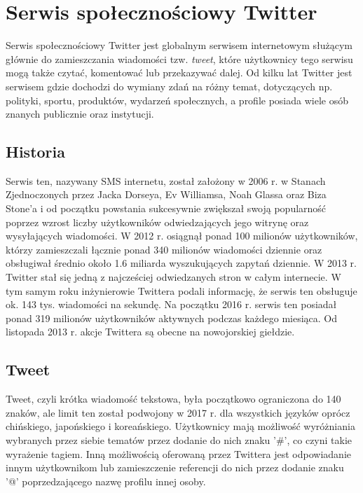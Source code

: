\chapter{Serwis społecznościowy Twitter}
Serwis spo\l{}eczno\'sciowy Twitter jest globalnym serwisem internetowym s\l{}u\.z\k{a}cym g\l{}\'ownie do zamieszczania wiadomo\'sci tzw. \textit{tweet}, kt\'ore u\.zytkownicy tego serwisu mog\k{a} także czytać, komentowa\'c lub przekazywa\'c dalej. Od kilku lat Twitter jest serwisem gdzie dochodzi do wymiany zdań na różny temat, dotyczących np. polityki, sportu, produktów, wydarzeń społecznych, a profile posiada wiele osób znanych publicznie oraz instytucji.

\section{Historia}
Serwis ten, nazywany SMS internetu, zosta\l{} za\l{}o\.zony w 2006 r. w Stanach Zjednoczonych przez Jacka Dorseya, Ev Williamsa, Noah Glassa oraz Biza Stone’a i od początku powstania sukcesywnie zwi\k{e}ksza\l{} swoj\k{a} popularno\'s\'c poprzez wzrost liczby u\.zytkownik\'ow odwiedzaj\k{a}cych jego witryn\k{e} oraz wysy\l{}aj\k{a}cych wiadomo\'sci. W 2012 r. osiągnął ponad 100 milionów użytkowników, którzy zamieszczali łącznie ponad 340 milionów wiadomo\'sci dziennie oraz obsługiwał \'srednio około 1.6 miliarda wyszukujących zapytań dziennie. W 2013 r. Twitter stał si\k{e} jedną z najcze\'sciej odwiedzanych stron w całym internecie. W tym samym roku inżynierowie Twittera podali informację, że serwis ten obsługuje ok. 143 tys. wiadomości na sekundę. Na początku 2016 r. serwis ten posiadał ponad 319 milionów użytkowników aktywnych podczas każdego miesiąca. Od listopada 2013 r. akcje Twittera są obecne na nowojorskiej giełdzie.

\section{Tweet}
Tweet, czyli krótka wiadomość tekstowa, by\l{}a pocz\k{a}tkowo ograniczona do 140 znak\'ow, ale limit ten zosta\l{} podwojony w 2017 r. dla wszystkich j\k{e}zyk\'ow opr\'ocz chi\'nskiego, japo\'nskiego i korea\'nskiego. Użytkownicy mają możliwość wyróżniania wybranych przez siebie tematów przez dodanie do nich znaku '\#', co czyni takie wyrażenie tagiem. Inną możliwością oferowaną przez Twittera jest odpowiadanie innym użytkownikom lub zamieszczenie referencji do nich przez dodanie znaku '@' poprzedzającego nazwę profilu innej osoby.

